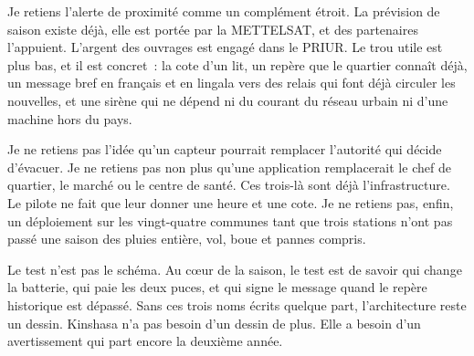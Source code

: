 \documentclass[12pt,a4paper]{article}
\begin{document}
Je retiens l'alerte de proximité comme un complément étroit. La prévision de saison existe déjà, elle est portée par la METTELSAT, et des partenaires l'appuient. L'argent des ouvrages est engagé dans le PRIUR. Le trou utile est plus bas, et il est concret~: la cote d'un lit, un repère que le quartier connaît déjà, un message bref en français et en lingala vers des relais qui font déjà circuler les nouvelles, et une sirène qui ne dépend ni du courant du réseau urbain ni d'une machine hors du pays.

Je ne retiens pas l'idée qu'un capteur pourrait remplacer l'autorité qui décide d'évacuer. Je ne retiens pas non plus qu'une application remplacerait le chef de quartier, le marché ou le centre de santé. Ces trois-là sont déjà l'infrastructure. Le pilote ne fait que leur donner une heure et une cote. Je ne retiens pas, enfin, un déploiement sur les vingt-quatre communes tant que trois stations n'ont pas passé une saison des pluies entière, vol, boue et pannes compris.

Le test n'est pas le schéma. Au cœur de la saison, le test est de savoir qui change la batterie, qui paie les deux puces, et qui signe le message quand le repère historique est dépassé. Sans ces trois noms écrits quelque part, l'architecture reste un dessin. Kinshasa n'a pas besoin d'un dessin de plus. Elle a besoin d'un avertissement qui part encore la deuxième année.
\end{document}
